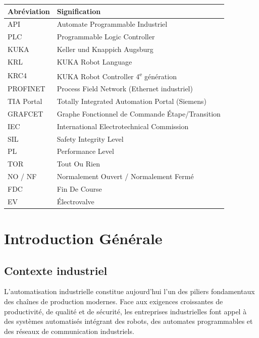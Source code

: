 \documentclass[12pt, a4paper]{report}
\newcommand{\plc}{PLC}
\newcommand{\api}{API}
\newcommand{\kuka}{KUKA}
\newcommand{\krl}{KRL}
\newcommand{\profinet}{PROFINET}
\newcommand{\tia}{TIA Portal}
\begin{document}
\begin{tabular}{@{}lL{10cm}@{}}
  \toprule
  \textbf{Abr\'eviation} & \textbf{Signification} \\
  \midrule
  \api{}    & Automate Programmable Industriel \\
  \plc{}    & Programmable Logic Controller \\
  \kuka{}   & Keller und Knappich Augsburg \\
  \krl{}    & KUKA Robot Language \\
  KRC4      & KUKA Robot Controller 4\textsuperscript{e} g\'en\'eration \\
  \profinet & Process Field Network (Ethernet industriel) \\
  \tia      & Totally Integrated Automation Portal (Siemens) \\
  GRAFCET   & Graphe Fonctionnel de Commande \'Etape/Transition \\
  IEC       & International Electrotechnical Commission \\
  SIL       & Safety Integrity Level \\
  PL        & Performance Level \\
  TOR       & Tout Ou Rien \\
  NO / NF   & Normalement Ouvert / Normalement Ferm\'e \\
  FDC       & Fin De Course \\
  EV        & \'Electrovalve \\
  \bottomrule
\end{tabular}

\cleardoublepage

\chapter{Introduction G\'en\'erale}

\section{Contexte industriel}

L'automatisation industrielle constitue aujourd'hui l'un des piliers fondamentaux
des cha\^ines de production modernes. Face aux exigences croissantes de productivit\'e,
de qualit\'e et de s\'ecurit\'e, les entreprises industrielles font appel \`a des syst\`emes
automatis\'es int\'egrant des robots, des automates programmables et des r\'eseaux de
communication industriels.
\end{document}
